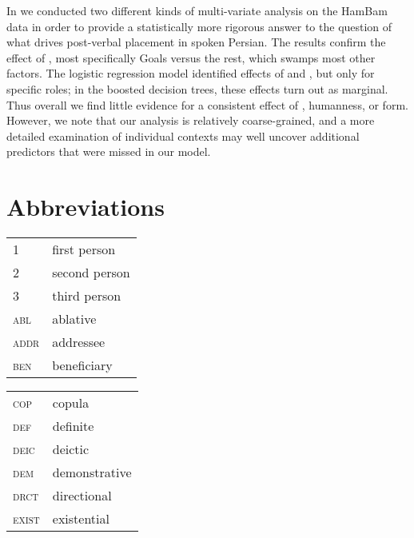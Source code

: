\documentclass[output=paper,colorlinks,citecolor=brown,draftmode]{langscibook}
\begin{document}
In  we conducted two different kinds of multi-variate analysis on the HamBam data in order to provide a statistically more rigorous answer to the question of what drives post-verbal placement in spoken Persian. The results confirm the effect of , most specifically Goals versus the rest, which swamps most other factors. The logistic regression model identified effects of  and , but only for specific roles; in the boosted decision trees, these effects turn out as marginal. Thus overall we find little evidence for a consistent effect of , humanness, or form. However, we note that our analysis is relatively coarse-grained, and a more detailed examination of individual contexts may well uncover additional predictors that were missed in our model.




\section*{Abbreviations}
\begin{tabularx}{.45\textwidth}{@{}lQ@{}}
1 & first person \\
2 & second person \\
3 & third person \\%
\textsc{abl} & {ablative} \\
\textsc{addr} & {addressee} \\
\textsc{ben} & beneficiary \\
\end{tabularx}
\begin{tabularx}{.45\textwidth}{@{}lQ@{}}
\textsc{cop} & {copula} \\
\textsc{def} & definite \\
\textsc{deic} & deictic \\
\textsc{dem} & demonstrative \\
\textsc{drct} & directional \\
\textsc{exist} & existential \\
\end{tabularx}
\end{document}
